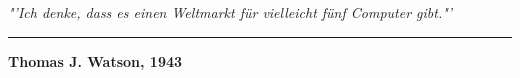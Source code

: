 \thispagestyle{empty}
\vspace*{12cm}
\begin{flushright}
    {\textit{"'Ich denke, dass es einen Weltmarkt für vielleicht fünf Computer gibt."'}}
\end{flushright} 
\vspace*{0.15cm}
\hrule
\vspace*{0.05cm}
\begin{flushright}{\textbf{Thomas J. Watson, 1943}}\end{flushright}